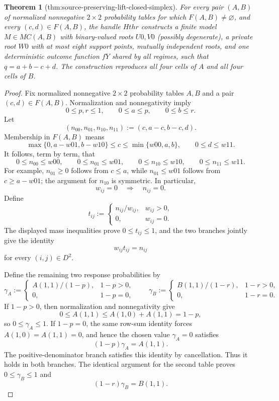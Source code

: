 \documentclass{article}
\newtheorem{theorem}{Theorem}
\begin{document}
\begin{theorem}[thm:source-preserving-lift-closed-simplex]\label{thm:source-preserving-lift-closed-simplex}
For every pair \((A,B)\) of normalized nonnegative \(2\times2\) probability tables for which \(F(A,B)\ne\varnothing\), and every \((c,d)\in F(A,B)\), the handle \(Hthr\) constructs a finite model \(M\in MC(A,B)\) with binary-valued roots \(U0,V0\) (possibly degenerate), a private root \(W0\) with at most eight support points, mutually independent roots, and one deterministic outcome function \(fY\) shared by all regimes, such that \(q=a+b-c+d\).  The construction reproduces all four cells of \(A\) and all four cells of \(B\).
\end{theorem}
\begin{proof}
Fix normalized nonnegative \(2\times2\) probability tables \(A,B\) and a pair \((c,d)\in F(A,B)\).  Normalization and nonnegativity imply
\[
0\le p,r\le1,\qquad 0\le a\le p,\qquad 0\le b\le r.
\]
Let
\[
(n_{00},n_{01},n_{10},n_{11}):=(c,a-c,b-c,d).
\]
Membership in \(F(A,B)\) means
\[
\max\{0,a-w01,b-w10\}\le c\le\min\{w00,a,b\},
\qquad 0\le d\le w11.
\]
It follows, term by term, that
\[
0\le n_{00}\le w00,\qquad
0\le n_{01}\le w01,\qquad
0\le n_{10}\le w10,\qquad
0\le n_{11}\le w11.
\]
For example, \(n_{01}\ge0\) follows from \(c\le a\), while \(n_{01}\le w01\) follows from \(c\ge a-w01\); the argument for \(n_{10}\) is symmetric.  In particular,
\[
w_{ij}=0\quad\Longrightarrow\quad n_{ij}=0.
\]
Define
\[
t_{ij}:=
\begin{cases}
n_{ij}/w_{ij},&w_{ij}>0,\\
0,&w_{ij}=0.
\end{cases}
\]
The displayed mass inequalities prove \(0\le t_{ij}\le1\), and the two branches jointly give the identity
\[
w_{ij}t_{ij}=n_{ij}
\]
for every \((i,j)\in D^2\).

Define the remaining two response probabilities by
\[
\gamma_A:=
\begin{cases}
A(1,1)/(1-p),&1-p>0,\\
0,&1-p=0,
\end{cases}
\qquad
\gamma_B:=
\begin{cases}
B(1,1)/(1-r),&1-r>0,\\
0,&1-r=0.
\end{cases}
\]
If \(1-p>0\), then normalization and nonnegativity give
\[
0\le A(1,1)\le A(1,0)+A(1,1)=1-p,
\]
so \(0\le\gamma_A\le1\).  If \(1-p=0\), the same row-sum identity forces \(A(1,0)=A(1,1)=0\), and hence the chosen value \(\gamma_A=0\) satisfies
\[
(1-p)\gamma_A=A(1,1).
\]
The positive-denominator branch satisfies this identity by cancellation.  Thus it holds in both branches.  The identical argument for the second table proves \(0\le\gamma_B\le1\) and
\[
(1-r)\gamma_B=B(1,1).
\]


\end{proof}
\end{document}
